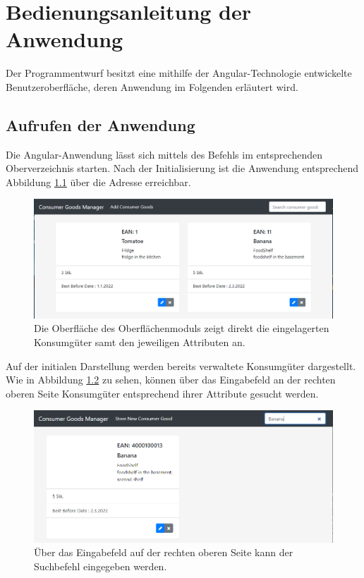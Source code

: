 \chapter{Bedienungsanleitung der Anwendung}
\label{Bedienungsanleitung}
Der Programmentwurf besitzt eine mithilfe der Angular-Technologie entwickelte Benutzeroberfläche, deren Anwendung im Folgenden erläutert wird.

\section{Aufrufen der Anwendung}
Die Angular-Anwendung lässt sich mittels des Befehls  im entsprechenden Oberverzeichnis starten.
Nach der Initialisierung ist die Anwendung entsprechend Abbildung \ref{fig:gui-initial-screen} über die Adresse \href{http://localhost:4200}{} erreichbar.

\begin{figure}[H]
	\centering
	\includegraphics[width=1.0\textwidth]{Bilder/gui/gui-initial-screen.PNG}
	\caption[Grafische Oberfläche des Oberflächenmoduls.]{Die Oberfläche des Oberflächenmoduls zeigt direkt die eingelagerten Konsumgüter samt den jeweiligen Attributen an.}
	\label{fig:gui-initial-screen}
\end{figure}

Auf der initialen Darstellung werden bereits verwaltete Konsumgüter dargestellt.
Wie in Abbildung \ref{fig:gui-search} zu sehen, können über das Eingabefeld an der rechten oberen Seite Konsumgüter entsprechend ihrer Attribute gesucht werden.

\begin{figure}[H]
	\centering
	\includegraphics[width=1.0\textwidth]{Bilder/gui/new/gui-search.PNG}
	\caption[Suchfunktion der Oberfläche.]{Über das Eingabefeld auf der rechten oberen Seite kann der Suchbefehl eingegeben werden.}
	\label{fig:gui-search}
\end{figure}

